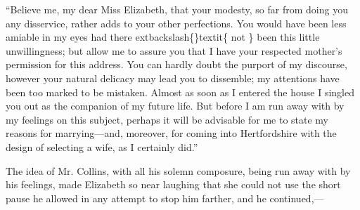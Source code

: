 \documentclass[10pt]{book}
\begin{document}
   “Believe me, my dear Miss Elizabeth, that your modesty, so far from
doing you any disservice, rather adds to your other perfections. You
would have been less amiable in my eyes had there
   	extbackslash\{\}textit\{
    not
   \}
   been this little
unwillingness; but allow me to assure you that I have your respected
mother’s permission for this address.
   You can hardly doubt the purport
of my discourse, however your natural delicacy may lead you to
dissemble; my attentions have been too marked to be mistaken. Almost as
soon as I entered the house I singled you out as the companion of my
future life. But before I am run away with by my feelings on this
subject, perhaps it will be advisable for me to state my reasons for
marrying—and, moreover, for coming into Hertfordshire with the design
of selecting a wife, as I certainly did.”
  

   The idea of Mr. Collins, with all his solemn composure, being run away
with by his feelings, made Elizabeth so near laughing that she could not
use the short pause he allowed in any attempt to stop him farther, and
he continued,—
  
\end{document}
